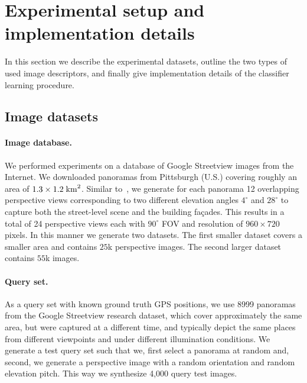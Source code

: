 \section{Experimental setup and implementation details}
\label{sec:experiments}
  In this section we describe the experimental datasets, outline the two types of used image descriptors, and finally give implementation details of the classifier learning procedure.
  

  \subsection{Image datasets}
    \paragraph{Image database.}
      We performed experiments on a database of Google Streetview images from the Internet. We downloaded panoramas from Pittsburgh (U.S.) covering roughly an area of $1.3 \times 1.2 \; {\rm km}^2$. Similar to~\cite{Chen11}, we generate for each panorama 12 overlapping perspective views corresponding to two different elevation angles $4^\circ$ and $28^\circ$ to capture both the street-level scene and the building fa\c{c}ades. This results in a total of 24 perspective views each with $90^\circ$ FOV and resolution of $960 \times 720$ pixels. In this manner we generate two datasets. The first smaller dataset covers a smaller area and contains $25$k perspective images.  The second larger dataset contains $55$k images.

      \paragraph{Query set.}
      As a query set with known ground truth GPS positions, we use 8999 panoramas from the Google Streetview research dataset, which cover approximately the same area, but were captured at a different time, and typically depict the same places from different viewpoints and under different illumination conditions.          
      We generate a test query set such that we, first select a panorama at random and, second, we generate a perspective image with a random orientation and random elevation pitch. This way we synthesize 4,000 query test images. 

